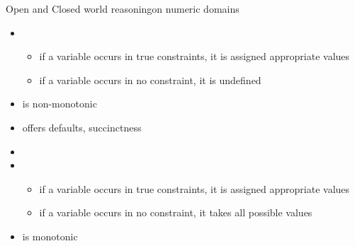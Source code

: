\begin{frame}{Open and Closed world reasoning}{on numeric domains}
  \bigskip
  \begin{itemize}
  \item<1-> 
    \begin{itemize}
    \item if a variable occurs in true constraints, it is assigned appropriate values
    \item if a variable occurs in no constraint, it is undefined
    \end{itemize}
  \item<only@3->[] is non-monotonic
  \item<only@4->[] offers defaults, succinctness
  \item<only@1-3>[]
  \item<2-> 
    \begin{itemize}
    \item if a variable occurs in true constraints, it is assigned appropriate values
    \item if a variable occurs in no constraint, it takes all possible values
    \end{itemize}
  \item<only@3->[] is monotonic
  \end{itemize}
\end{frame}
%
